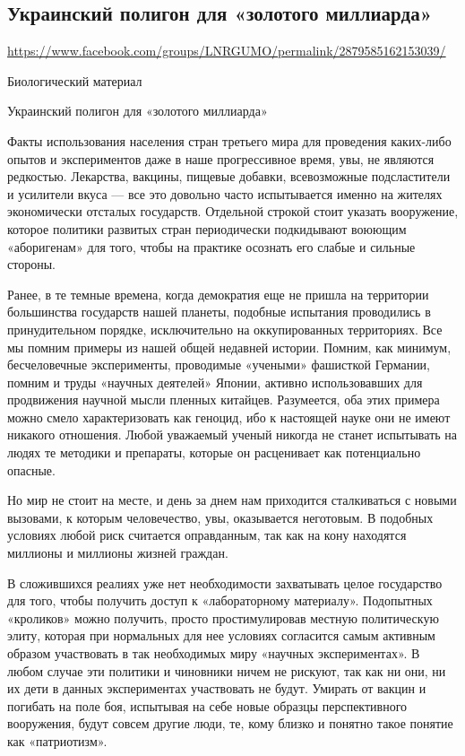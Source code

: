  
 

\subsection{Украинский полигон для «золотого миллиарда»}
\url{https://www.facebook.com/groups/LNRGUMO/permalink/2879585162153039/}


Биологический материал

Украинский полигон для «золотого миллиарда»

Факты использования населения стран третьего мира для проведения каких-либо
опытов и экспериментов даже в наше прогрессивное время, увы, не являются
редкостью. Лекарства, вакцины, пищевые добавки, всевозможные подсластители и
усилители вкуса --- все это довольно часто испытывается именно на жителях
экономически отсталых государств. Отдельной строкой стоит указать вооружение,
которое политики развитых стран периодически подкидывают воюющим «аборигенам»
для того, чтобы на практике осознать его слабые и сильные стороны.

Ранее, в те темные времена, когда демократия еще не пришла на территории
большинства государств нашей планеты, подобные испытания проводились в
принудительном порядке, исключительно на оккупированных территориях. Все мы
помним примеры из нашей общей недавней истории. Помним, как минимум,
бесчеловечные эксперименты, проводимые «учеными» фашисткой Германии, помним и
труды «научных деятелей» Японии, активно использовавших для продвижения научной
мысли пленных китайцев. Разумеется, оба этих примера можно смело
характеризовать как геноцид, ибо к настоящей науке они не имеют никакого
отношения. Любой уважаемый ученый никогда не станет испытывать на людях те
методики и препараты, которые он расценивает как потенциально опасные.

Но мир не стоит на месте, и день за днем нам приходится сталкиваться с новыми
вызовами, к которым человечество, увы, оказывается неготовым. В подобных
условиях любой риск считается оправданным, так как на кону находятся миллионы и
миллионы жизней граждан.

В сложившихся реалиях уже нет необходимости захватывать целое государство для
того, чтобы получить доступ к «лабораторному материалу». Подопытных «кроликов»
можно получить, просто простимулировав местную политическую элиту, которая при
нормальных для нее условиях согласится самым активным образом участвовать в так
необходимых миру «научных экспериментах». В любом случае эти политики и
чиновники ничем не рискуют, так как ни они, ни их дети в данных экспериментах
участвовать не будут. Умирать от вакцин и погибать на поле боя, испытывая на
себе новые образцы перспективного вооружения, будут совсем другие люди, те,
кому близко и понятно такое понятие как «патриотизм».

